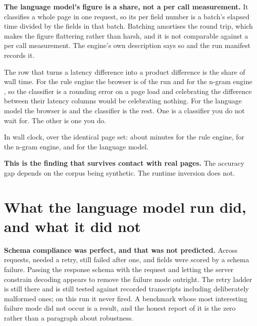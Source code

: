 \textbf{The language model's figure is a share, not a per call measurement.} It
classifies a whole page in one request, so its per field number is a batch's
elapsed time divided by the fields in that batch. Batching amortises the round
trip, which makes the figure flattering rather than harsh, and it is not
comparable against a per call measurement. The engine's own description says so
and the run manifest records it.

The row that turns a latency difference into a product difference is the share of
wall time. For the rule engine the browser is \vRulesLoadShare{} of the run and
for the n-gram engine \vNgramLoadShare{}, so the classifier is a rounding error
on a page load and celebrating the difference between their latency columns would
be celebrating nothing. For the language model the browser is \vLlmLoadShare{}
and the classifier is the rest. One is a classifier you do not wait for. The
other is one you do.

In wall clock, over the identical page set: about \vRulesMinutes{} minutes for
the rule engine, \vNgramMinutes{} for the n-gram engine, and \vLlmMinutes{} for
the language model.

\textbf{This is the finding that survives contact with real pages.} The accuracy
gap depends on the corpus being synthetic. The runtime inversion does not.

\section{What the language model run did, and what it did not}

\begin{table}[htbp]
  \centering
  \caption{The language model run, including the failure mode that did not
  occur.}
  \label{tab:llm-run}
  
\end{table}

\textbf{Schema compliance was perfect, and that was not predicted.} Across
\vLlmRequests{} requests, \vLlmRetried{} needed a retry, \vLlmFailed{} still
failed after one, and \vLlmUnresolved{} fields were scored  by a
schema failure. Passing the response schema with the request and letting the
server constrain decoding appears to remove the failure mode outright. The retry
ladder is still there and is still tested against recorded transcripts including
deliberately malformed ones; on this run it never fired. A benchmark whose most
interesting failure mode did not occur is a result, and the honest report of it is
the zero rather than a paragraph about robustness.

